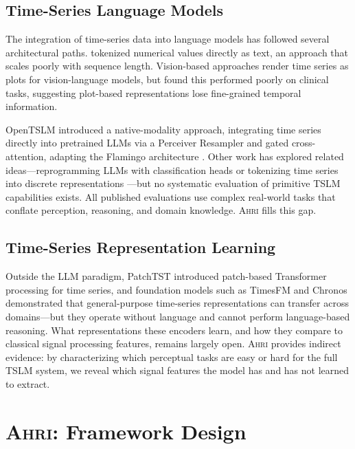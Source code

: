 \documentclass[11pt]{article}
\newcommand{\ahri}{\textsc{Ahri}}
\begin{document}
\subsection{Time-Series Language Models}

The integration of time-series data into language models has followed several architectural paths. \citet{gruver2023large} tokenized numerical values directly as text, an approach that scales poorly with sequence length. Vision-based approaches render time series as plots for vision-language models, but \citet{langer2025opentslm} found this performed poorly on clinical tasks, suggesting plot-based representations lose fine-grained temporal information.

OpenTSLM \citep{langer2025opentslm} introduced a native-modality approach, integrating time series directly into pretrained LLMs via a Perceiver Resampler and gated cross-attention, adapting the Flamingo architecture \citep{alayrac2022flamingo}. Other work has explored related ideas---reprogramming LLMs with classification heads \citep{ye2025medualtime,pillai2025time2lang} or tokenizing time series into discrete representations \citep{sivarajkumar2023clinical,kim2024ts}---but no systematic evaluation of primitive TSLM capabilities exists. All published evaluations use complex real-world tasks that conflate perception, reasoning, and domain knowledge. \ahri{} fills this gap.

\subsection{Time-Series Representation Learning}

Outside the LLM paradigm, PatchTST \citep{nie2023patchtst} introduced patch-based Transformer processing for time series, and foundation models such as TimesFM \citep{das2024timesfm} and Chronos \citep{ansari2024chronos} demonstrated that general-purpose time-series representations can transfer across domains---but they operate without language and cannot perform language-based reasoning. What representations these encoders learn, and how they compare to classical signal processing features, remains largely open. \ahri{} provides indirect evidence: by characterizing which perceptual tasks are easy or hard for the full TSLM system, we reveal which signal features the model has and has not learned to extract.


\section{\ahri{}: Framework Design}
\label{sec:framework}
\end{document}
